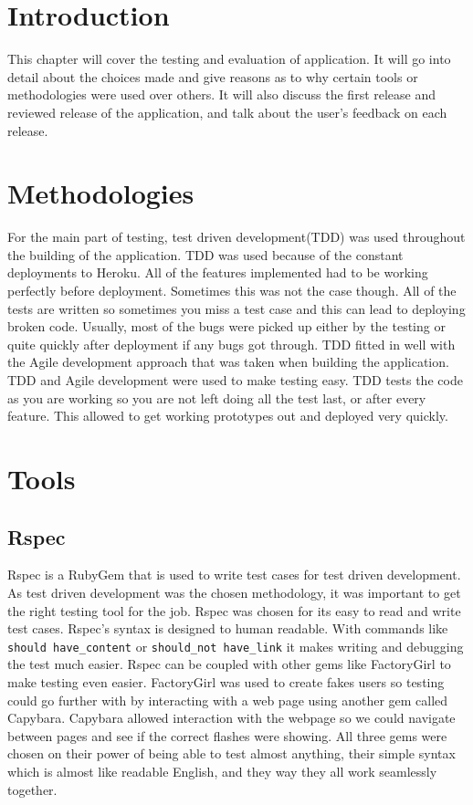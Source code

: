 \section{Introduction}
This chapter will cover the testing and evaluation of application. It will go into detail about the choices made and give reasons as to why certain tools or methodologies were used over others. It will also discuss the first release and reviewed release of the application, and talk about the user's feedback on each release.\\

\section{Methodologies}
For the main part of testing, test driven development(TDD) was used throughout the building of the application. TDD was used because of the constant deployments to Heroku. All of the features implemented had to be working perfectly before deployment. Sometimes this was not the case though. All of the tests are written so sometimes you miss a test case and this can lead to deploying broken code. Usually, most of the bugs were picked up either by the testing or quite quickly after deployment if any bugs got through. TDD fitted in well with the Agile development approach that was taken when building the application. TDD and Agile development were used to make testing easy. TDD tests the code as you are working so you are not left doing all the test last, or after every feature. This allowed to get working prototypes out and deployed very quickly.\\

\section{Tools}
\subsection{Rspec}
Rspec is a RubyGem that is used to write test cases for test driven development. As test driven development was the chosen methodology, it was important to get the right testing tool for the job. Rspec was chosen for its easy to read and write test cases. Rspec's syntax is designed to human readable. With commands like \lstinline{should have_content} or \lstinline{should_not have_link} it makes writing and debugging the test much easier. Rspec can be coupled with other gems like FactoryGirl to make testing even easier. FactoryGirl was used to create fakes users so testing could go further with by interacting with a web page using another gem called Capybara. Capybara allowed interaction with the webpage so we could navigate between pages and see if the correct flashes were showing. All three gems were chosen on their power of being able to test almost anything, their simple syntax which is almost like readable English, and they way they all work seamlessly together.

